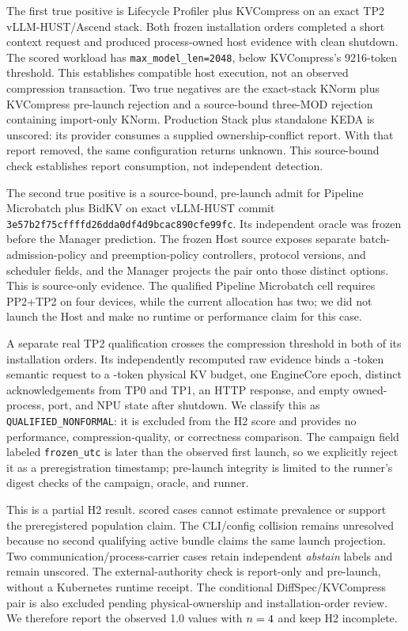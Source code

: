 \documentclass[letterpaper,twocolumn,10pt]{article}
\newcommand{\code}[1]{\texttt{#1}}
\begin{document}
The first true positive is Lifecycle Profiler plus KVCompress on an exact TP2
vLLM-HUST/Ascend stack.  Both frozen installation orders completed a short
context request and produced process-owned host evidence with clean shutdown.
The scored workload has \code{max\_model\_len=2048}, below KVCompress's
9216-token threshold.  This establishes compatible host execution, not an
observed compression transaction.  Two true negatives are the exact-stack
KNorm plus KVCompress pre-launch rejection and a source-bound three-MOD
rejection containing import-only KNorm.  Production Stack plus standalone
KEDA is unscored: its provider consumes a supplied ownership-conflict report.
With that report removed, the same configuration returns unknown.  This
source-bound check establishes report consumption, not independent detection.

The second true positive is a source-bound, pre-launch admit for Pipeline
Microbatch plus BidKV on exact vLLM-HUST commit
\code{3e57b2f75cffffd26dda0df4d9bcac890cfe99fc}.  Its independent oracle was
frozen before the Manager prediction.  The frozen Host source exposes separate
batch-admission-policy and preemption-policy controllers, protocol versions,
and scheduler fields, and the Manager projects the pair onto those distinct
options.  This is source-only evidence.  The qualified Pipeline Microbatch
cell requires PP2+TP2 on four devices, while the current allocation has two;
we did not launch the Host and make no runtime or performance claim for this
case.

A separate real TP2 qualification crosses the compression threshold in both
of its \ECPAHTwoCompressionOrders{} installation orders.  Its independently
recomputed raw evidence binds a \ECPAHTwoCompressionSemanticTokens{}-token
semantic request to a \ECPAHTwoCompressionPhysicalTokens{}-token physical KV
budget, one EngineCore epoch, \ECPAHTwoCompressionWorkerAcks{} distinct
acknowledgements from TP0 and TP1, an HTTP response, and empty owned-process,
port, and NPU state after shutdown.  We classify this
as \code{QUALIFIED\_NONFORMAL}: it is excluded from the H2 score and provides
no performance, compression-quality, or correctness comparison.  The campaign
field labeled \code{frozen\_utc} is later than the observed first launch, so
we explicitly reject it as a preregistration timestamp; pre-launch integrity
is limited to the runner's digest checks of the campaign, oracle, and runner.

This is a partial H2 result.  \ECPAHTwoScoredCases{} scored cases cannot estimate prevalence or
support the preregistered population claim.  The CLI/config collision remains
unresolved because no second qualifying active bundle claims the same launch
projection.  Two communication/process-carrier cases retain independent
\emph{abstain} labels and remain unscored.  The external-authority check is
report-only and pre-launch, without a Kubernetes runtime receipt.  The conditional
DiffSpec/KVCompress pair is also excluded pending physical-ownership and
installation-order review.  We therefore report the observed 1.0 values with
$n=4{}$ and keep H2 incomplete.
\end{document}
